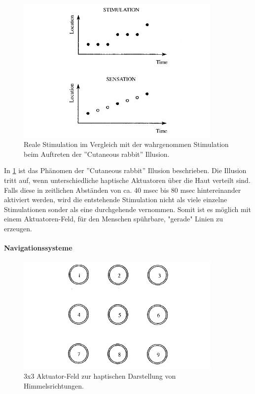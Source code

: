 \documentclass{llncs}					%
\begin{document}
\begin{figure}[htbp]
	\begin{center}
		\includegraphics[width = 10cm]{Grafiken/14-Sensory-Saltation.png}
		\caption{Reale Stimulation im Vergleich mit der wahrgenommen Stimulation beim Auftreten der ''Cutaneous rabbit'' Illusion\cite{Tan:2005:TDS:1198555.1198611}.}
		\label{14-Sensory-Saltation}
	\end{center}
\end{figure}

In \ref{14-Sensory-Saltation} ist das Phänomen der ''Cutaneous rabbit''\cite{geldard1972cutaneous} Illusion beschrieben. Die Illusion tritt auf, wenn unterschiedliche haptische Aktuatoren über die Haut verteilt sind. Falls diese in zeitlichen Abständen von ca. 40 msec bis 80 msec hintereinander aktiviert werden, wird die entstehende Stimulation nicht als viele einzelne Stimulationen sonder als eine durchgehende vernommen. Somit ist es möglich mit einem Aktuatoren-Feld, für den Menschen spührbare, "gerade" Linien zu erzeugen.

\paragraph{Navigationssysteme}

\begin{figure}[htbp]
    \begin{center}
        \includegraphics[width = 10cm]{Grafiken/14-3x3-Grid.png}
        \caption{3x3 Aktuator-Feld zur haptischen Darstellung von Himmelsrichtungen\cite{Tan:2005:TDS:1198555.1198611}.}
        \label{14-3x3-Grid}
    \end{center}
\end{figure}
\end{document}
